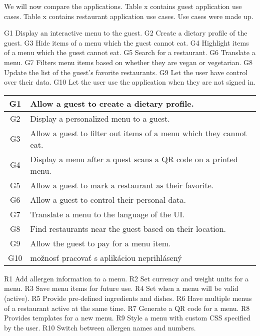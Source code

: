 We will now compare the applications.
Table x contains guest application use cases.
Table x contains restaurant application use cases.
Use cases were made up.

G1 Display an interactive menu to the guest.
G2 Create a dietary profile of the guest.
G3 Hide items of a menu which the guest cannot eat.
G4 Highlight items of a menu which the guest cannot eat.
G5 Search for a restaurant.
G6 Translate a menu.
G7 Filters menu items based on whether they are vegan or vegetarian.
G8 Update the list of the guest's favorite restaurants.
G9 Let the user have control over their data.
G10 Let the user use the application when they are not signed in.

\begin{center}
  \begin{tabular}{| c | l |}
    \hline
    G1 & Allow a guest to create a dietary profile. \\
    \hline
    G2 & Display a personalized menu to a guest. \\
    \hline
    G3 & Allow a guest to filter out items of a menu which they cannot eat. \\
    \hline
    G4 & Display a menu after a quest scans a QR code on a printed menu. \\
    \hline
    G5 & Allow a guest to mark a restaurant as their favorite. \\
    \hline
    G6 & Allow a guest to control their personal data. \\
    \hline
    G7 & Translate a menu to the language of the UI. \\
    \hline
    G8 & Find restaurants near the guest based on their location. \\
    \hline
    G9 & Allow the guest to pay for a menu item. \\ %
    \hline
    G10 & možnosť pracovať s aplikáciou neprihlásený \\
    \hline
  \end{tabular}
  \newline
\end{center}

R1 Add allergen information to a menu.
R2 Set currency and weight units for a menu.
R3 Save menu items for future use.
R4 Set when a menu will be valid (active). 
R5 Provide pre-defined ingredients and dishes.
R6 Have multiple menus of a restaurant active at the same time.
R7 Generate a QR code for a menu.
R8 Provides templates for a new menu.
R9 Style a menu with custom CSS specified by the user. 
R10 Switch between allergen names and numbers.

